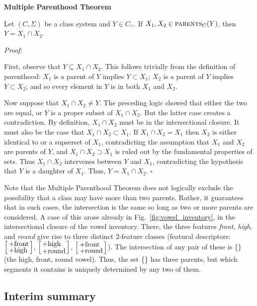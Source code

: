 \documentclass[12pt, oneside]{article}   	%
\newenvironment{clump}
{
	\edef\myindent{\the\parindent}
	\noindent\begin{minipage}{\textwidth}
	\setlength\parindent{\myindent}\fussy
}
{
	\end{minipage}
}
\newcommand{\featmattwo}[2]{$\begin{bsmallmatrix*}[l]\text{\normalsize #1}\\\text{\normalsize #2}\end{bsmallmatrix*}$}
\begin{document}
\begin{clump}
\vspace{\baselineskip} \noindent \textbf{Multiple Parenthood Theorem}

\noindent Let $(C, \Sigma)$ be a class system and $Y \in C_\cap$. If $X_1, X_2 \in \textsc{parents}_C(Y)$, then $Y = X_1 \cap X_2$.
\end{clump}

\noindent \textit{Proof}:

First, observe that $Y \subseteq X_1 \cap X_2$. This follows trivially from the definition of parenthood: $X_1$ is a parent of $Y$ implies $Y \subset X_1$; $X_2$ is a parent of $Y$ implies $Y \subset X_2$; and so every element in $Y$ is in both $X_1$ and $X_2$.

Now suppose that $X_1 \cap X_2 \neq Y$. The preceding logic showed that either the two are equal, or $Y$ is a proper subset of $X_1 \cap X_2$. But the latter case creates a contradiction. By definition, $X_1 \cap X_2$ must be in the intersectional closure. It must also be the case that $X_1 \cap X_2 \subset X_1$. If $X_1 \cap X_2 = X_1$ then $X_2$ is either identical to or a supserset of $X_1$, contradicting the assumption that $X_1$ and $X_2$ are parents of $Y$, and $X_1 \cap X_2 \supset X_1$ is ruled out by the fundamental properties of sets. Thus $X_1 \cap X_2$ intervenes between $Y$ and $X_1$, contradicting the hypothesis that $Y$ is a daughter of $X_1$. Thus, $Y = X_1 \cap X_2$. $\square$

\vspace{0.5\baselineskip} Note that the Multiple Parenthood Theorem does not logically exclude the possibility that a class may have more than two parents. Rather, it guarantees that in such cases, the intersection is the same so long as two or more parents are considered. A case of this arose already in Fig.~\ref{fig:vowel_inventory}, in the intersectional closure of the vowel inventory. There, the three features \textit{front}, \textit{high}, and \textit{round} give rise to three distinct 2-feature classes (featural descriptors: \featmattwo{+front}{+high}, \featmattwo{+high}{+round}, \featmattwo{+front}{+round}). The intersection of any pair of these is \{\} (the high, front, round vowel). Thus, the set  \{\} has three parents, but which segments it contains is uniquely determined by any two of them.

\subsection{Interim summary}
\end{document}
